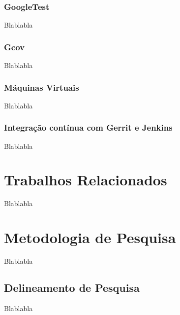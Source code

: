 \documentclass[11.5pt]{article}
\begin{document}
\subsubsection{GoogleTest}
Blablabla

\subsubsection{Gcov}
Blablabla

\subsubsection{Máquinas Virtuais}
Blablabla

\subsubsection{Integração contínua com Gerrit e Jenkins}
Blablabla




\section{Trabalhos Relacionados}
Blablabla




\section{Metodologia de Pesquisa}
Blablabla


\subsection{Delineamento de Pesquisa}
Blablabla

\end{document}
